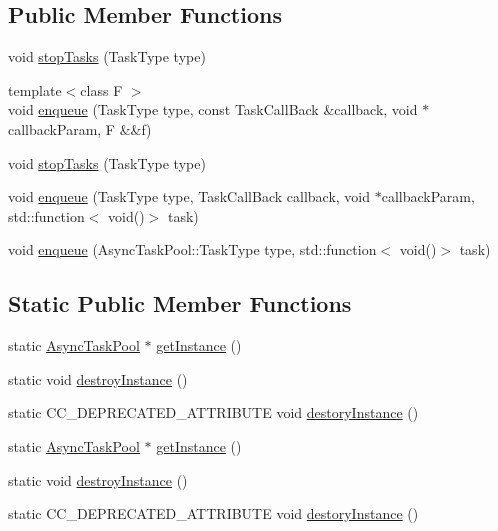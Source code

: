 \subsection*{Public Member Functions}
\begin{DoxyCompactItemize}
\item 
void \hyperlink{group__base_gacb1c072daf35d81ddc62e1f40b61da29}{stop\+Tasks} (Task\+Type type)
\item 
{\footnotesize template$<$class F $>$ }\\void \hyperlink{group__base_ga0e3628387bd146dc14d59271760a6fe2}{enqueue} (Task\+Type type, const Task\+Call\+Back \&callback, void $\ast$callback\+Param, F \&\&f)
\item 
void \hyperlink{classAsyncTaskPool_acb1c072daf35d81ddc62e1f40b61da29}{stop\+Tasks} (Task\+Type type)
\item 
void \hyperlink{group__base_gafba78936b0f70e83213652ec4c0c491c}{enqueue} (Task\+Type type, Task\+Call\+Back callback, void $\ast$callback\+Param, std\+::function$<$ void()$>$ task)
\item 
void \hyperlink{group__base_ga6034f6bbde8bda7d6763520a8732618c}{enqueue} (Async\+Task\+Pool\+::\+Task\+Type type, std\+::function$<$ void()$>$ task)
\end{DoxyCompactItemize}
\subsection*{Static Public Member Functions}
\begin{DoxyCompactItemize}
\item 
static \hyperlink{classAsyncTaskPool}{Async\+Task\+Pool} $\ast$ \hyperlink{classAsyncTaskPool_ab5fb56f692bc6ad57b53a5ce0dcd7a06}{get\+Instance} ()
\item 
static void \hyperlink{classAsyncTaskPool_a3197eae4bc1c9f17fa2869cf70b7bad4}{destroy\+Instance} ()
\item 
static C\+C\+\_\+\+D\+E\+P\+R\+E\+C\+A\+T\+E\+D\+\_\+\+A\+T\+T\+R\+I\+B\+U\+TE void \hyperlink{classAsyncTaskPool_a9e0a8926935d80cf5ce73ac7d748a4ae}{destory\+Instance} ()
\item 
static \hyperlink{classAsyncTaskPool}{Async\+Task\+Pool} $\ast$ \hyperlink{classAsyncTaskPool_a218bb071a3ed7ddf9a609a66e6275b37}{get\+Instance} ()
\item 
static void \hyperlink{classAsyncTaskPool_a3b8724f5864c54e50c207496284b6af5}{destroy\+Instance} ()
\item 
static C\+C\+\_\+\+D\+E\+P\+R\+E\+C\+A\+T\+E\+D\+\_\+\+A\+T\+T\+R\+I\+B\+U\+TE void \hyperlink{classAsyncTaskPool_a9e0a8926935d80cf5ce73ac7d748a4ae}{destory\+Instance} ()
\end{DoxyCompactItemize}

